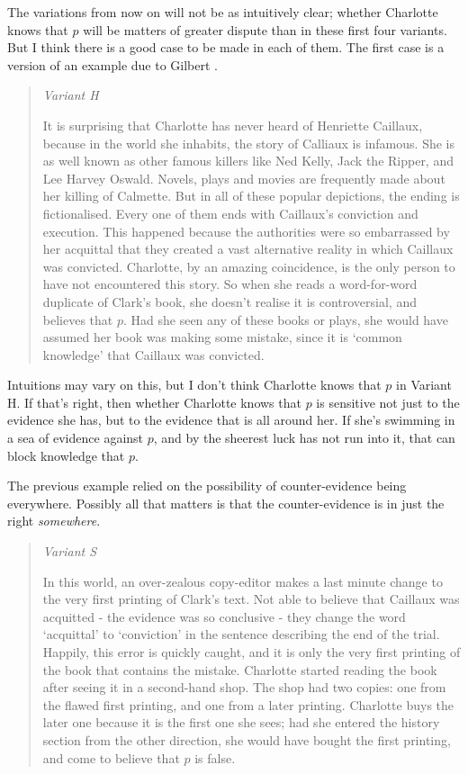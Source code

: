 \documentclass[11pt,]{book}
\begin{document}
The variations from now on will not be as intuitively clear; whether Charlotte knows that \(p\) will be matters of greater dispute than in these first four variants. But I think there is a good case to be made in each of them. The first case is a version of an example due to Gilbert \citet[143ff]{Harman1973}.

\begin{quote}
\emph{Variant H}

It is surprising that Charlotte has never heard of Henriette Caillaux, because in the world she inhabits, the story of Calliaux is infamous. She is as well known as other famous killers like Ned Kelly, Jack the Ripper, and Lee Harvey Oswald. Novels, plays and movies are frequently made about her killing of Calmette. But in all of these popular depictions, the ending is fictionalised. Every one of them ends with Caillaux's conviction and execution. This happened because the authorities were so embarrassed by her acquittal that they created a vast alternative reality in which Caillaux was convicted. Charlotte, by an amazing coincidence, is the only person to have not encountered this story. So when she reads a word-for-word duplicate of Clark's book, she doesn't realise it is controversial, and believes that \(p\). Had she seen any of these books or plays, she would have assumed her book was making some mistake, since it is `common knowledge' that Caillaux was convicted.
\end{quote}

Intuitions may vary on this, but I don't think Charlotte knows that \(p\) in Variant H. If that's right, then whether Charlotte knows that \(p\) is sensitive not just to the evidence she has, but to the evidence that is all around her. If she's swimming in a sea of evidence against \(p\), and by the sheerest luck has not run into it, that can block knowledge that \(p\).

The previous example relied on the possibility of counter-evidence being everywhere. Possibly all that matters is that the counter-evidence is in just the right \emph{somewhere}.

\begin{quote}
\emph{Variant S}

In this world, an over-zealous copy-editor makes a last minute change to the very first printing of Clark's text. Not able to believe that Caillaux was acquitted - the evidence was so conclusive - they change the word `acquittal' to `conviction' in the sentence describing the end of the trial. Happily, this error is quickly caught, and it is only the very first printing of the book that contains the mistake. Charlotte started reading the book after seeing it in a second-hand shop. The shop had two copies: one from the flawed first printing, and one from a later printing. Charlotte buys the later one because it is the first one she sees; had she entered the history section from the other direction, she would have bought the first printing, and come to believe that \(p\) is false.
\end{quote}
\end{document}
